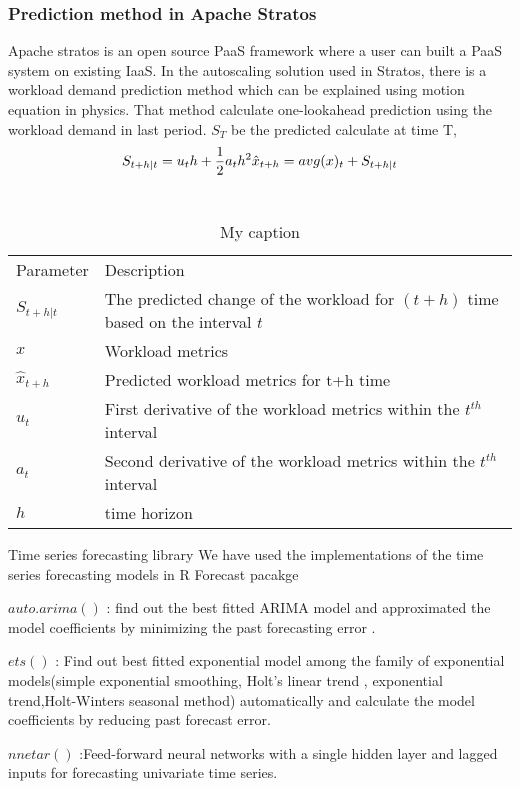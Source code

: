 \subsubsection{Prediction method in Apache Stratos}

Apache stratos is an open source PaaS framework where a user can built a PaaS system on existing IaaS. In the autoscaling solution used in Stratos, there is a workload demand prediction method which can be explained using motion equation in physics. That method calculate one-lookahead prediction using the workload demand in last period.
$S_T$ be the predicted  calculate at time T, 
$$S_{t+h|t} = u_{t}h+ \frac{1}{2} a_{t}h^2 \\
\hat{x}_{t+h}=avg(x)_{t}  + S_{t+h|t}$$ \\

\begin{table}[]
\centering
\caption{My caption}
\label{my-label}
\begin{tabular}{ll}
Parameter       & Description                                                                     \\
$S_{t+h|t}$     & The predicted change of the workload for $(t+h)$ time based on the interval $t$ \\
$x$             & Workload metrics                                                                \\
$\hat{x}_{t+h}$ & Predicted workload metrics for t+h time                                         \\
$u_{t}$         & First derivative of the workload metrics within the $t^{th}$ interval           \\
$a_{t}$         & Second derivative of the workload metrics within the $t^{th}$ interval          \\
$h$             & time horizon                                                                   
\end{tabular}
\end{table}


Time series forecasting library
We have used the implementations of the time series forecasting models in R Forecast pacakge \cite{forecastPackage}

$auto.arima()$ :  find out the best fitted ARIMA model and approximated the model coefficients by minimizing the past forecasting error \cite{forecasting_otexts}.

$ets()$ : Find out best fitted exponential model among the family of exponential models(simple exponential smoothing, Holt's linear trend , exponential trend,Holt-Winters seasonal method) automatically and calculate the model coefficients by reducing past forecast error. \cite{forecasting_otexts}
    
$nnetar()$ :Feed-forward neural networks with a single hidden layer and lagged inputs for forecasting univariate time series.
